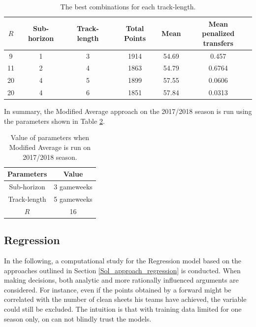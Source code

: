 \begin{table}[!htb]
\centering
\begin{tabular}{|c|c|c|c|c|c|}
\hline
$R$ & Sub-horizon & Track-length & Total Points & Mean & \makecell{Mean \\ penalized transfers}  \\
\hline
9  \Tstrut      & 1       & 3                & 1914         & 54.69     & 0.457  \\
11      & 2       & 4                & 1863         & 54.79     & 0.6764 \\
20      & 4       & 5                & 1899         & 57.55     & 0.0606 \\
20   \Bstrut    & 4       & 6                & 1851         & 57.84     & 0.0313 \\
\hline
\end{tabular}
\caption{The best combinations for each track-length.}
\label{tab:top_5}
\end{table}


In summary, the Modified Average approach on the 2017/2018 season is run using the parameters shown in Table \ref{tab:final_parameters_ma}.


\begin{table}[!htb]
\centering
\begin{tabular}{|c|c|}
    \hline
    Parameters      &  Value \\
    \hline
    Sub-horizon \Tstrut     &   3 gameweeks \\
    Track-length    &   5 gameweeks \\ 
    $R$         \Bstrut     &   16 \\ 
    \hline
\end{tabular}
\caption{Value of parameters when Modified Average is run on 2017/2018 season.}
\label{tab:final_parameters_ma}
\end{table}

\subsection{Regression}\label{exp_setup_reg}

In the following, a computational study for the Regression model based on the approaches outlined in Section \ref{Sol_approach_regression} is conducted. When making decisions, both analytic and more rationally influenced arguments are considered. For instance, even if the points obtained by a forward might be correlated with the number of clean sheets his teams have achieved, the variable could still be excluded. The intuition is that with training data limited for one season only, on can not blindly trust the models. 

